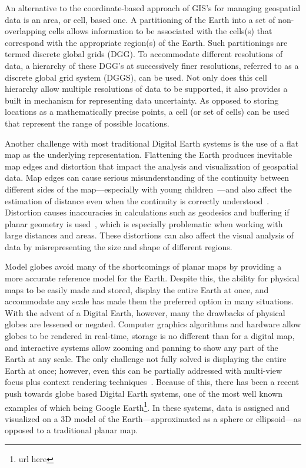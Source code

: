An alternative to the coordinate-based approach of GIS's for managing geospatial data is an area, or cell, based one.
A partitioning of the Earth into a set of non-overlapping cells allows information to be associated with the cells(s) that correspond with the appropriate region(s) of the Earth.
Such partitionings are termed discrete global grids (DGG).
To accommodate different resolutions of data, a hierarchy of these DGG's at successively finer resolutions, referred to as a discrete global grid system (DGGS), can be used.
Not only does this cell hierarchy allow multiple resolutions of data to be supported, it also provides a built in mechanism for representing data uncertainty.
As opposed to storing locations as a mathematically precise points, a cell (or set of cells) can be used that represent the range of possible locations.


Another challenge with most traditional Digital Earth systems is the use of a flat map as the underlying representation.
Flattening the Earth produces inevitable map edges and distortion that impact the analysis and visualization of geospatial data.
Map edges can cause serious misunderstanding of the continuity between different sides of the map---especially with young children~\cite{hennerdal2015beyond}---and also affect the estimation of distance even when the continuity is correctly understood~\cite{hruby20182000}.
Distortion causes inaccuracies in calculations such as geodesics and buffering if planar geometry is used~\cite{flaterbuffering}, which is especially problematic when working with large distances and areas.
These distortions can also affect the visual analysis of data by misrepresenting the size and shape of different regions.


Model globes avoid many of the shortcomings of planar maps by providing a more accurate reference model for the Earth.
Despite this, the ability for physical maps to be easily made and stored, display the entire Earth at once, and accommodate any scale has made them the preferred option in many situations. 
With the advent of a Digital Earth, however, many the drawbacks of physical globes are lessened or negated.
Computer graphics algorithms and hardware allow globes to be rendered in real-time, storage is no different than for a digital map, and interactive systems allow zooming and panning to show any part of the Earth at any scale.
The only challenge not fully solved is displaying the entire Earth at once; however, even this can be partially addressed with multi-view focus plus context rendering techniques~\cite{mark-sherlock}.
Because of this, there has been a recent push towards globe based Digital Earth systems, one of the most well known examples of which being Google Earth\footnote{url here}.
In these systems, data is assigned and visualized on a 3D model of the Earth---approximated as a sphere or ellipsoid---as opposed to a traditional planar map.

